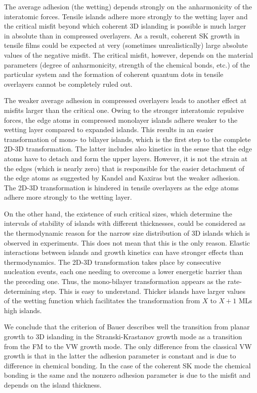 \documentclass[aps,prl,showpacs,twocolumn,byrevtex,floatfix]{revtex4-1}
\begin{document}
The average adhesion (the wetting) depends strongly on the anharmonicity of the
interatomic forces. Tensile islands adhere more strongly to the wetting layer
and the critical misfit beyond which coherent 3D islanding is possible is much
larger in absolute than in compressed overlayers. As a result, coherent 
SK growth in tensile films could be expected at very (sometimes
unrealistically) large absolute values of the negative misfit. The critical
misfit, however, depends on the material parameters (degree of anharmonicity,
strength of the chemical bonds, etc.) of the particular system and the 
formation of coherent quantum dots in tensile overlayers cannot be completely 
ruled out.


The weaker average adhesion in compressed overlayers leads to another effect at
misfits larger than the critical one. Owing to the stronger interatomic
repulsive forces, the edge atoms in compressed monolayer islands adhere 
weaker to the wetting layer compared to expanded islands.
This results in an easier transformation of mono- to bilayer islands, which is
the first step to the complete 2D-3D transformation. The latter includes also
kinetics in the sense that the edge atoms have to detach and form the upper
layers. However, it is not the strain at the edges (which is nearly zero) that
is responsible for the easier detachment of the edge atoms as suggested by
Kandel and Kaxiras\cite{Kandel95} but the weaker adhesion. The 2D-3D
transformation is hindered in tensile overlayers as the edge atoms adhere more
strongly to the wetting layer.

On the other hand, the existence of such critical sizes, which determine the
intervals of stability of islands with different thicknesses, could be
considered as the thermodynamic reason for the narrow size distribution of 3D
islands which is observed in experiments. This does not mean that this is the
only reason. Elastic interactions between islands and growth kinetics can have
stronger effects than thermodynamics. The 2D-3D transformation takes place
by consecutive nucleation events, each one needing to overcome a lower energetic
barrier than the preceding one. Thus, the mono-bilayer transformation appears as
the rate-determining step. This is easy to understand. Thicker islands have
larger values of the wetting function which facilitates the transformation from
$X$ to $X+1$ MLs high islands.

We conclude that the criterion of Bauer describes well the transition from
planar growth to 3D islanding in the Stranski-Krastanov growth mode as a
transition from the FM to the VW growth mode. 
The only difference from the classical VW
growth is that in the latter the adhesion parameter is constant and is due to
difference in chemical bonding. In the case of the coherent SK mode the chemical
bonding is the same and the nonzero adhesion parameter is due to the 
misfit and depends on the island thickness.
\end{document}
